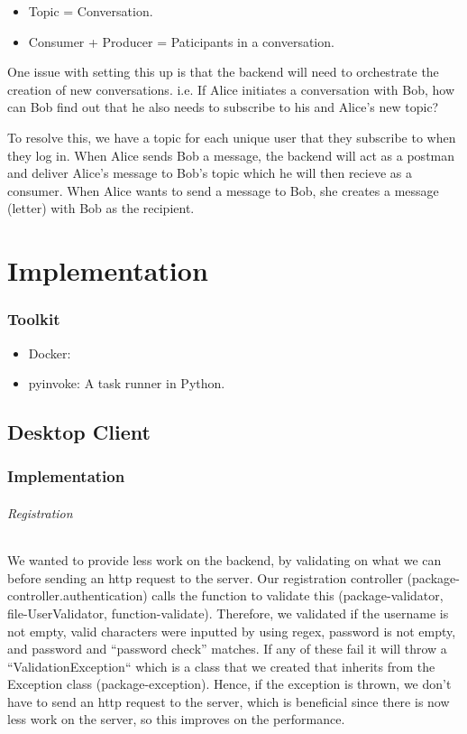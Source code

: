 \documentclass[11pt,a4paper]{report}
\begin{document}
\begin{itemize}
  \item Topic = Conversation.
  \item Consumer + Producer = Paticipants in a conversation.
\end{itemize}

One issue with setting this up is that the backend will need to orchestrate the creation of new conversations. i.e. If Alice initiates a conversation with Bob, how can Bob find out that he also needs to subscribe to his and Alice's new topic?

To resolve this, we have a topic for each unique user that they subscribe to when they log in. When Alice sends Bob a message, the backend will act as a postman and deliver Alice's message to Bob's topic which he will then recieve as a consumer. When Alice wants to send a message to Bob, she creates a message (letter) with Bob as the recipient.

\chapter{Implementation}

\subsection{Toolkit}

\begin{itemize}
  \item Docker:
  \item pyinvoke: A task runner in Python.
\end{itemize}

\section{Desktop Client}

\subsection{Implementation}

\subparagraph{Registration}
We wanted to provide less work on the backend, by validating on what we can before sending an http request to the server. Our registration controller (package-controller.authentication) calls the function to validate this (package-validator, file-UserValidator, function-validate). Therefore, we validated if the username is not empty, valid characters were inputted by using regex, password is not empty, and password and “password check” matches. If any of these fail it will throw a “ValidationException“ which is a class that we created that inherits from the Exception class (package-exception). Hence, if the exception is thrown, we don’t have to send an http request to the server, which is beneficial since there is now less work on the server, so this improves on the performance.
\end{document}
